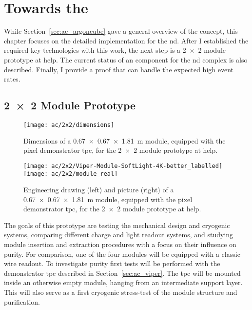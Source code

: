 \chapter{Towards the  }
\label{chap:dune-nd}

While Section~\ref{sec:ac_argoncube} gave a general overview of the \AC{} concept, this chapter focuses on the detailed implementation for the \dune{} \gls{nd}.
After I established the required key technologies with this work, the next step is a \num{2 x 2} module prototype at \gls{help}.
The current status of an \AC{} \lartpc{} component for the \dune{} \gls{nd} complex is also described.
Finally, I provide a proof that \AC{} can handle the expected high event rates.


\section{\num{2 x 2} Module \AC{} Prototype}
\label{sec:dune-nd_ac-2x2}

\begin{figure}[htb]
	\centering
	\texttt{[image: ac/2x2/dimensions]}
	\caption[\AC{} \num{2 x 2} prototype module dimensions]{%
		Dimensions of a \SI{0.67 x 0.67 x 1.81}{\metre} module, equipped with the pixel demonstrator \acrshort{tpc}, for the \num{2 x 2} module \AC{} prototype at \acrshort{help}.
	}
	\label{fig:2x2_dim}
\end{figure}

\begin{figure}[htb]
	\centering
	\texttt{[image: ac/2x2/Viper-Module-SoftLight-4K-better\_labelled]}
	\texttt{[image: ac/2x2/module\_real]}
	\caption[\AC{} \num{2 x 2} prototype module]{%
		Engineering drawing (left) and picture (right) of a \SI{0.67 x 0.67 x 1.81}{\metre} module, equipped with the pixel demonstrator \acrshort{tpc}, for the \num{2 x 2} module \AC{} prototype at \acrshort{help}.
	}
	\label{fig:2x2_mod}
\end{figure}

The goals of this prototype are testing the mechanical design and cryogenic systems, comparing different charge and light readout systems, and studying module insertion and extraction procedures with a focus on their influence on purity.
For comparison, one of the four modules will be equipped with a classic wire readout.
To investigate purity first tests will be performed with the \AC{} demonstrator \gls{tpc} described in Section~\ref{sec:ac_viper}.
The \gls{tpc} will be mounted inside an otherwise empty module, hanging from an intermediate support layer.
This will also serve as a first cryogenic stress-test of the module structure and \lar{} purification.

